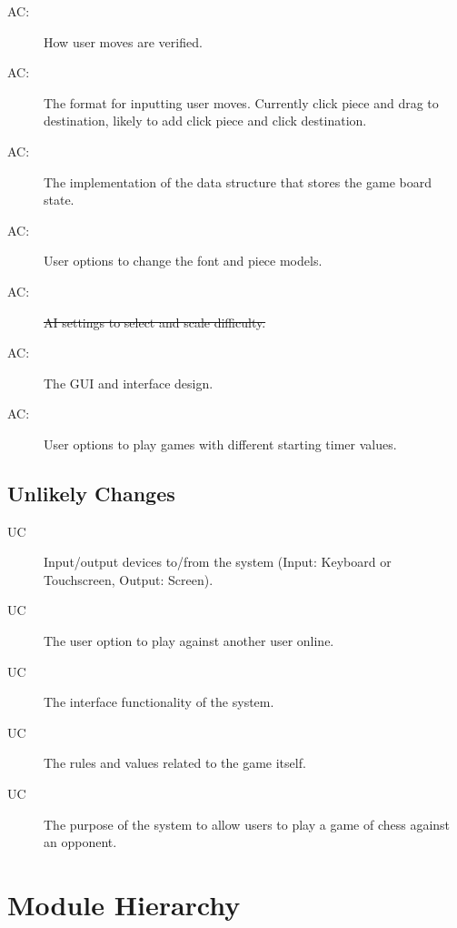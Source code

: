 \documentclass[12pt, titlepage]{article}
\newcounter{acnum}
\newcommand{\actheacnum}{AC\theacnum}
\newcounter{ucnum}
\newcommand{\uctheucnum}{UC\theucnum}
\begin{document}
\begin{description}
\item[ \actheacnum \label{acVerification}:] How user moves are verified.
\item[ \actheacnum \label{acInput}:] The format for inputting user moves. Currently click piece and drag to destination, likely to add click piece and click destination.
\item[ \actheacnum \label{acBoardState}:] The implementation of the data structure that stores the game board state.
\item[ \actheacnum \label{acFontAndPieces}:] User options to change the font and piece models.
\item[ \actheacnum \label{acAI}:] \sout{AI settings to select and scale difficulty.}
\item[ \actheacnum \label{acGUI}:] The GUI and interface design.
\item[ \actheacnum \label{acTimers}:] User options to play games with different starting timer values.
\end{description}

\subsection{Unlikely Changes} \label{SecUchange}

\begin{description}
\item[ \uctheucnum] Input/output devices to/from the system (Input: Keyboard or Touchscreen, Output: Screen).
\item[ \uctheucnum] The user option to play against another user online.
\item[ \uctheucnum] The interface functionality of the system.
\item[ \uctheucnum] The rules and values related to the game itself.
\item[ \uctheucnum] The purpose of the system to allow users to play a game of chess against an opponent.
\end{description}

\section{Module Hierarchy} \label{SecMH}
\end{document}
